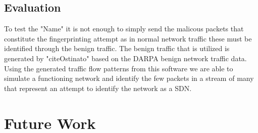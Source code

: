 \documentclass[twocolumn]{article}
\begin{document}
\subsection{Evaluation}

To test the "Name" it is not enough to simply send the malicous packets that constitute the fingerprinting attempt as in normal network traffic these must be identified through the benign traffic. The benign traffic that is utilized is generated by "cite{Ostinato}" based on the DARPA benign network traffic data. Using the generated traffic flow patterns from this software we are able to simulate a functioning network and identify the few packets in a stream of many that represent an attempt to identify the network as a SDN.

\section{Future Work}




\end{document}
